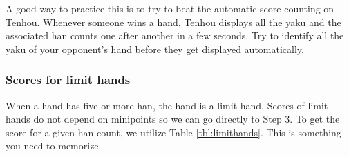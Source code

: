 \bigskip

A good way to practice this is to try to beat the automatic score counting on {\jap Tenhou}. Whenever someone wins a hand, {\jap Tenhou} displays all the {\jap yaku} and the associated {\jap han} counts one after another in a few seconds. Try to identify all the {\jap yaku} of your opponent's hand before they get displayed automatically.

\subsubsection{Scores for limit hands}
When a hand has five or more {\jap han}, the hand is a limit hand. Scores of limit hands do not depend on minipoints so we can go directly to Step 3. To get the score for a given {\jap han} count, we utilize Table \ref{tbl:limithands}. This is something you need to memorize.

